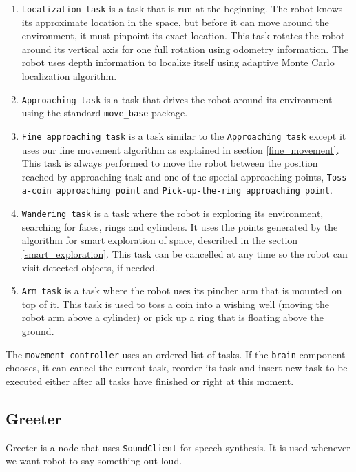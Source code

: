 \documentclass[12pt,a4paper]{article}
\begin{document}
	\begin{enumerate}
		\item \texttt{Localization task} is a task that is run at the beginning. The robot knows its approximate location in the space, but before it can move around the environment, it must pinpoint its exact location. This task rotates the robot around its vertical axis for one full rotation using odometry information. The robot uses depth information to localize itself using adaptive Monte Carlo localization algorithm.
		\item \texttt{Approaching task} is a task that drives the robot around its environment using the standard \texttt{move\_base} package.
		\item \texttt{Fine approaching task} is a task similar to the \texttt{Approaching task} except it uses our fine movement algorithm as explained in section \ref{fine_movement}. This task is always performed to move the robot between the position reached by approaching task and one of the special approaching points, \texttt{Toss-a-coin approaching point} and \texttt{Pick-up-the-ring approaching point}.
		\item \texttt{Wandering task} is a task where the robot is exploring its environment, searching for faces, rings and cylinders. It uses the points generated by the algorithm for smart exploration of space, described in the section \ref{smart_exploration}. This task can be cancelled at any time so the robot can visit detected objects, if needed.
		\item \texttt{Arm task} is a task where the robot uses its pincher arm that is mounted on top of it. This task is used to toss a coin into a wishing well (moving the robot arm above a cylinder) or pick up a ring that is floating above the ground.
	\end{enumerate}

	The \texttt{movement controller} uses an ordered list of tasks. If the \texttt{brain} component chooses, it can cancel the current task, reorder its task and insert new task to be executed either after all tasks have finished or right at this moment. \\
	
	\subsection{Greeter}
	Greeter is a node that uses \texttt{SoundClient} for speech synthesis. It is used whenever we want robot to say something out loud. \\
	
\end{document}
